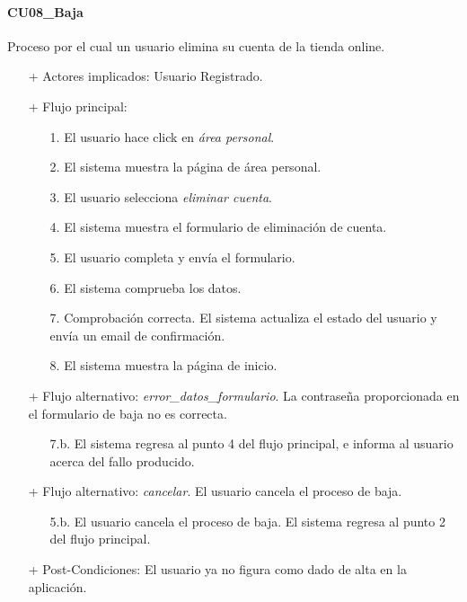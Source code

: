\documentclass[a4paper,12pt,twoside,openright]{report}
\begin{document}
            \paragraph{CU08\_Baja}
                Proceso por el cual un usuario elimina su cuenta de la tienda online.
                \begin{itemize}
                    \item[+] Actores implicados: Usuario Registrado.
                    \item[+] Flujo principal:
                    \begin{enumerate}
                        \item[1.] El usuario hace click en \emph{área personal}.
                        \item[2.] El sistema muestra la página de área personal.
                        \item[3.] El usuario selecciona \emph{eliminar cuenta}.
                        \item[4.] El sistema muestra el formulario de eliminación de cuenta.
                        \item[5.] El usuario completa y envía el formulario.
                        \item[6.] El sistema comprueba los datos.
                        \item[7.] Comprobación correcta. El sistema actualiza el estado del usuario y envía un email de confirmación.
                        \item[8.] El sistema muestra la página de inicio.
                    \end{enumerate}
                    \item[+] Flujo alternativo: \emph{error\_datos\_formulario}. La contraseña proporcionada en el formulario de baja no es correcta.
                    \begin{itemize}
                        \item[7.b.] El sistema regresa al punto 4 del flujo principal, e informa al usuario acerca del fallo producido.
                    \end{itemize}
                    \item[+] Flujo alternativo: \emph{cancelar}. El usuario cancela el proceso de baja.
                    \begin{itemize}
                        \item[5.b.] El usuario cancela el proceso de baja. El sistema regresa al punto 2 del flujo principal.
                    \end{itemize}
                    \item[+] Post-Condiciones: El usuario ya no figura como dado de alta en la aplicación.
                \end{itemize}
\end{document}

